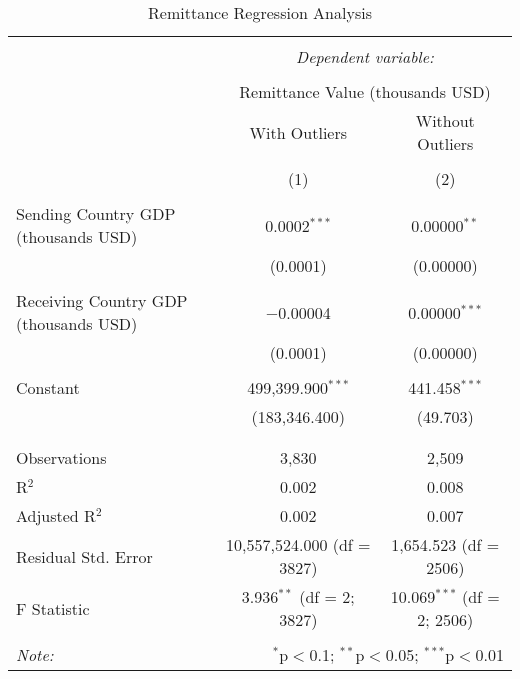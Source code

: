 
\begin{table}[!htbp] \centering 
  \caption{Remittance Regression Analysis} 
  \label{} 
\begin{tabular}{@{\extracolsep{5pt}}lcc} 
\\[-1.8ex]\hline 
\hline \\[-1.8ex] 
 & \multicolumn{2}{c}{\textit{Dependent variable:}} \\ 
\cline{2-3} 
\\[-1.8ex] & \multicolumn{2}{c}{Remittance Value (thousands USD)} \\ 
 & With Outliers & Without Outliers \\ 
\\[-1.8ex] & (1) & (2)\\ 
\hline \\[-1.8ex] 
 Sending Country GDP (thousands USD) & 0.0002$^{***}$ & 0.00000$^{**}$ \\ 
  & (0.0001) & (0.00000) \\ 
  & & \\ 
 Receiving Country GDP (thousands USD) & $-$0.00004 & 0.00000$^{***}$ \\ 
  & (0.0001) & (0.00000) \\ 
  & & \\ 
 Constant & 499,399.900$^{***}$ & 441.458$^{***}$ \\ 
  & (183,346.400) & (49.703) \\ 
  & & \\ 
\hline \\[-1.8ex] 
Observations & 3,830 & 2,509 \\ 
R$^{2}$ & 0.002 & 0.008 \\ 
Adjusted R$^{2}$ & 0.002 & 0.007 \\ 
Residual Std. Error & 10,557,524.000 (df = 3827) & 1,654.523 (df = 2506) \\ 
F Statistic & 3.936$^{**}$ (df = 2; 3827) & 10.069$^{***}$ (df = 2; 2506) \\ 
\hline 
\hline \\[-1.8ex] 
\textit{Note:}  & \multicolumn{2}{r}{$^{*}$p$<$0.1; $^{**}$p$<$0.05; $^{***}$p$<$0.01} \\ 
\end{tabular} 
\end{table} 

